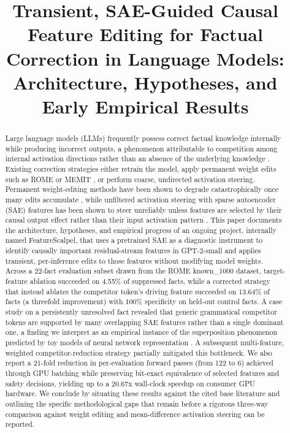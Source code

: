 \documentclass[conference]{IEEEtran}
\begin{document}
\title{Transient, SAE-Guided Causal Feature Editing for Factual Correction in Language Models: Architecture, Hypotheses, and Early Empirical Results}

\author{
}

\maketitle

\begin{abstract}
Large language models (LLMs) frequently possess correct factual knowledge internally while producing incorrect outputs, a phenomenon attributable to competition among internal activation directions rather than an absence of the underlying knowledge \cite{elhage2022superposition, meng2022rome}. Existing correction strategies either retrain the model, apply permanent weight edits such as ROME or MEMIT \cite{meng2022rome}, or perform coarse, undirected activation steering. Permanent weight-editing methods have been shown to degrade catastrophically once many edits accumulate \cite{gupta2024forgetting}, while unfiltered activation steering with sparse autoencoder (SAE) features has been shown to steer unreliably unless features are selected by their causal output effect rather than their input activation pattern \cite{arad2025steering}. This paper documents the architecture, hypotheses, and empirical progress of an ongoing project, internally named FeatureScalpel, that uses a pretrained SAE as a diagnostic instrument to identify causally important residual-stream features in GPT-2-small and applies transient, per-inference edits to those features without modifying model weights. Across a 22-fact evaluation subset drawn from the ROME known\_1000 dataset, target-feature ablation succeeded on 4.55\% of suppressed facts, while a corrected strategy that instead ablates the competitor token's driving feature succeeded on 13.64\% of facts (a threefold improvement) with 100\% specificity on held-out control facts. A case study on a persistently unresolved fact revealed that generic grammatical competitor tokens are supported by many overlapping SAE features rather than a single dominant one, a finding we interpret as an empirical instance of the superposition phenomenon predicted by toy models of neural network representation \cite{elhage2022superposition}. A subsequent multi-feature, weighted competitor-reduction strategy partially mitigated this bottleneck. We also report a 21-fold reduction in per-evaluation forward passes (from 122 to 6) achieved through GPU batching while preserving bit-exact equivalence of selected features and safety decisions, yielding up to a 20.67x wall-clock speedup on consumer GPU hardware. We conclude by situating these results against the cited base literature and outlining the specific methodological gaps that remain before a rigorous three-way comparison against weight editing and mean-difference activation steering can be reported.
\end{abstract}
\end{document}
